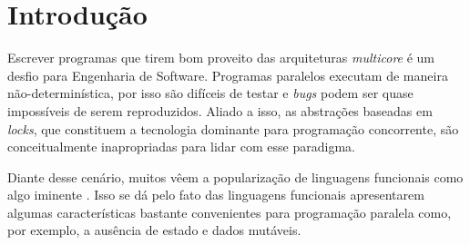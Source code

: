 \chapter{Introdução}

Escrever programas que tirem bom proveito das arquiteturas \emph{multicore} é um desfio para Engenharia de Software. Programas paralelos executam de maneira não-determinística, por isso são difíceis de testar e \emph{bugs} podem ser quase impossíveis de serem reproduzidos. Aliado a isso, as abstrações baseadas em \emph{locks}, que constituem a tecnologia dominante para programação concorrente, são conceitualmente inapropriadas para lidar com esse paradigma. \cite{jones2007beautiful}


Diante desse cenário, muitos vêem a popularização de linguagens funcionais como algo iminente \cite{theeconomist}. Isso se dá pelo fato das linguagens funcionais apresentarem algumas características bastante convenientes para programação paralela como, por exemplo, a ausência de estado e dados mutáveis. 